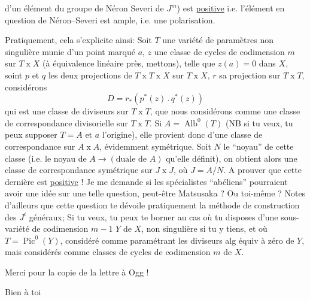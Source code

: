 

d'un élément du groupe de Néron Severi de $J^m$) est \uline{positive} i.e. l'élément en question de Néron--Severi est ample, i.e. une polarisation.

Pratiquement, cela s'explicite ainsi: Soit $T$ une variété de paramètres  non singulière munie d'un point marqué $a$, $z$ une classe de cycles de codimension $m$ sur $T\mathbin{x}X$ (à équivalence linéaire près, mettons), telle que $z(a)=0$ dans $X$, soint $p$ et $q$ les deux projections de $T\mathbin{x}T\mathbin{x}X$ sur $T\mathbin{x}X$, $r$ sa projection sur $T\mathbin{x}T$, considérons
\[
D=r_*(p^*(z)\mathbin{.}q^*(z))
\]
qui est une classe de diviseurs sur $T\mathbin{x}T$, que nous considérons comme une classe de correspondance divisorielle sur $T\mathbin{x}T$. Si $A=\operatorname{Alb}^0(T)$ (NB si tu veux, tu peux supposer $T=A$ et $a$ l'origine), elle provient donc d'une classe de correspondance sur $A\mathbin{x}A$, évidemment symétrique. Soit $N$ le ``noyau'' de cette classe (i.e. le noyau de $A\longrightarrow(\text{duale de }A)$ qu'elle définit), on obtient alors une classe de correspondance symétrique sur $J\mathbin{x}J$, où $J=A/N$. A prouver que cette dernière est \uline{positive} ! Je me demande si les spécialistes ``abéliens'' pourraient avoir une idée sur une telle question, peut-être Matsusaka ? Ou toi-même ? Notes d'ailleurs que cette question te dévoile pratiquement la méthode de construction des $J^i$ généraux; Si tu veux, tu peux te borner  au cas où tu disposes d'une sous-variété de codimension $m-1$ $Y$ de $X$, non singulière si tu y tiens,  et où $T=\operatorname{Pic}^0(Y)$, considéré comme paramétrant les diviseurs alg équiv à zéro de $Y$, mais considérés comme classes de cycles  de codimension $m$ de $X$.

Merci pour la copie de la lettre à Ogg !

Bien à toi

